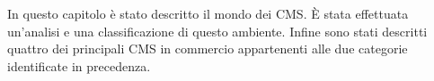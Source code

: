 In questo capitolo è stato descritto il mondo dei CMS. È stata effettuata un'analisi e una classificazione di questo ambiente. Infine sono stati descritti quattro dei principali CMS in commercio appartenenti alle due categorie identificate in precedenza.